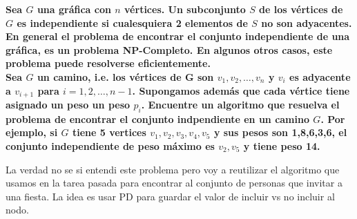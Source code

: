 \textbf{
    Sea $G$ una gráfica con $n$ vértices. Un subconjunto $S$ de los vértices de
    $G$ es independiente si cualesquiera 2 elementos de $S$ no son adyacentes.
    En general el problema de encontrar el conjunto independiente de una gráfica, 
    es un problema NP-Completo. En algunos otros casos, este problema puede resolverse
    eficientemente. \\
    Sea $G$ un camino, i.e. los vértices de G son $v_1, v_2, \ldots, v_n$ y $v_i$
    es adyacente a $v_{i+1}$ para $i = 1, 2, \ldots, n-1$. Supongamos además que cada 
    vértice tiene asignado un peso un peso $p_i$. Encuentre un algoritmo que resuelva 
    el problema de encontrar el conjunto indpendiente en un camino $G$. Por ejemplo,
    si $G$ tiene 5 vertices ${v_1, v_2, v_3, v_4, v_5}$ y sus pesos son {1,8,6,3,6},
    el conjunto independiente de peso máximo es ${v_2,v_5}$ y tiene peso 14.
}\vspace{.2cm}

La verdad no se si entendi este problema pero voy a reutilizar el algoritmo que usamos en la tarea pasada para encontrar al conjunto de personas que invitar a una fiesta. La idea es usar PD para guardar el valor de incluir vs no incluir al nodo. \vspace{.2cm}

